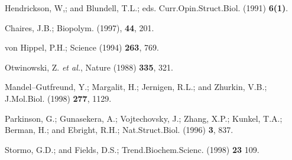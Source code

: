 \begin{thebibliography}{999}
Hendrickson, W,; and Blundell, T.L.; eds.
Curr.Opin.Struct.Biol. (1991) {\bf 6(1)}.


Chaires, J.B.;
Biopolym. (1997), {\bf 44}, 201.


von Hippel, P.H.;
Science (1994) {\bf 263}, 769.

Otwinowski, Z. {\it et al.},
Nature (1988) {\bf 335}, 321.

Mandel--Gutfreund, Y.; Margalit, H.; Jernigen, R.L.; and Zhurkin, V.B.;
J.Mol.Biol. (1998) {\bf 277}, 1129.

Parkinson, G.; Gunasekera, A.; Vojtechovsky, J.; Zhang, X.P.;
Kunkel, T.A.; Berman, H.; and Ebright, R.H.;
Nat.Struct.Biol. (1996) {\bf 3}, 837.


Stormo, G.D.; and Fields, D.S.;
Trend.Biochem.Scienc. (1998) {\bf 23} 109.



\end{thebibliography} 






